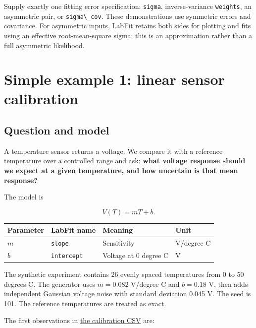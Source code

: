 \documentclass[
  british,
  10pt,
  a4paper,
]{article}
\newcommand{\passthrough}[1]{#1}
\begin{document}
Supply exactly one fitting error specification:
\passthrough{\lstinline!sigma!}, inverse-variance
\passthrough{\lstinline!weights!}, an asymmetric pair, or
\passthrough{\lstinline!sigma\_cov!}. These demonstrations use symmetric
errors and covariance. For asymmetric inputs, LabFit retains both sides
for plotting and fits using an effective root-mean-square sigma; this is
an approximation rather than a full asymmetric likelihood.

\clearpage

\section{Simple example 1: linear sensor
calibration}\label{simple-example-1-linear-sensor-calibration}


\subsection{Question and model}\label{question-and-model}

A temperature sensor returns a voltage. We compare it with a reference
temperature over a controlled range and ask: \textbf{what voltage
response should we expect at a given temperature, and how uncertain is
that mean response?}

The model is

\begin{equation}V(T)=mT+b.\end{equation}

\begin{longtable}[]{@{}llll@{}}
\toprule\noalign{}
Parameter & LabFit name & Meaning & Unit \\
\midrule\noalign{}
\endhead
\bottomrule\noalign{}
\endlastfoot
\(m\) & \passthrough{\lstinline!slope!} & Sensitivity & V/degree C \\
\(b\) & \passthrough{\lstinline!intercept!} & Voltage at 0 degree C &
V \\
\end{longtable}

The synthetic experiment contains 26 evenly spaced temperatures from 0
to 50 degrees C. The generator uses \(m=0.082\) V/degree C and
\(b=0.18\) V, then adds independent Gaussian voltage noise with standard
deviation 0.045 V. The seed is 101. The reference temperatures are
treated as exact.

The first observations in \href{data/calibration.csv}{the calibration
CSV} are:
\end{document}

